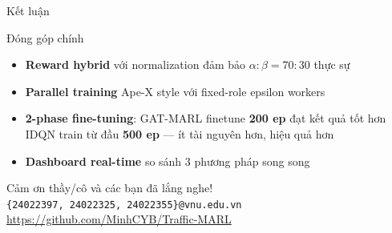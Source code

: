\documentclass[aspectratio=169]{beamer}
\begin{document}
\begin{frame}{Kết luận}
  \begin{block}{Đóng góp chính}
    \begin{itemize}
      \item \textbf{Reward hybrid} với normalization đảm bảo $\alpha{:}\beta = 70{:}30$ thực sự
      \item \textbf{Parallel training} Ape-X style với fixed-role epsilon workers
      \item \textbf{2-phase fine-tuning}: GAT-MARL finetune \textbf{200 ep} đạt kết quả tốt hơn IDQN train từ đầu \textbf{500 ep} --- ít tài nguyên hơn, hiệu quả hơn
      \item \textbf{Dashboard real-time} so sánh 3 phương pháp song song
    \end{itemize}
  \end{block}

  \vspace{0.5em}
  \begin{center}
    \large Cảm ơn thầy/cô và các bạn đã lắng nghe!\\[0.5em]
    \normalsize \texttt{\{24022397, 24022325, 24022355\}@vnu.edu.vn}\\
    \url{https://github.com/MinhCYB/Traffic-MARL}
  \end{center}
\end{frame}

\end{document}
